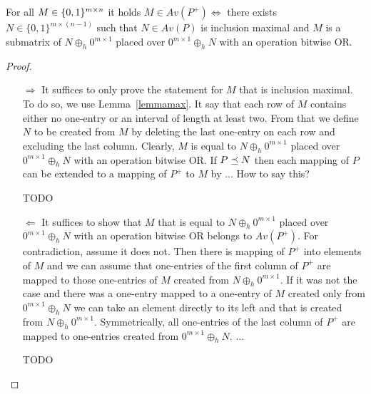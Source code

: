 \begin{thm}
\label{emptymiddle}
For all $M\in\{0,1\}^{m\times n}$ it holds $M\in Av(P^+)\Leftrightarrow$ there exists $N\in\{0,1\}^{m\times(n-1)}$ such that $N\in Av(P)$ is inclusion maximal and $M$ is a submatrix of $N\oplus_h0^{m\times1}$ placed over $0^{m\times1}\oplus_hN$ with an operation bitwise OR.
\end{thm}
\begin{proof}
\begin{itemize}
\item[$\Rightarrow$] It suffices to only prove the statement for $M$ that is inclusion maximal. To do so, we use Lemma~\ref{lemmamax}. It say that each row of $M$ contains either no one-entry or an interval of length at least two. From that we define $N$ to be created from $M$ by deleting the last one-entry on each row and excluding the last column. Clearly, $M$ is equal to $N\oplus_h0^{m\times1}$ placed over $0^{m\times1}\oplus_hN$ with an operation bitwise OR. If $P\preceq N$ then each mapping of $P$ can be extended to a mapping of $P^+$ to $M$ by ... How to say this?

TODO
\item[$\Leftarrow$] It suffices to show that $M$ that is equal to $N\oplus_h0^{m\times1}$ placed over $0^{m\times1}\oplus_hN$ with an operation bitwise OR belongs to $Av(P^+)$. For contradiction, assume it does not. Then there is mapping of $P^+$ into elements of $M$ and we can assume that one-entries of the first column of $P^+$ are mapped to those one-entries of $M$ created from $N\oplus_h0^{m\times1}$. If it was not the case and there was a one-entry mapped to a one-entry of $M$ created only from $0^{m\times1}\oplus_hN$ we can take an element directly to its left and that is created from $N\oplus_h0^{m\times1}$. Symmetrically, all one-entries of the last column of $P^+$ are mapped to one-entries created from $0^{m\times1}\oplus_hN$. ...

TODO
\end{itemize}
\end{proof}

